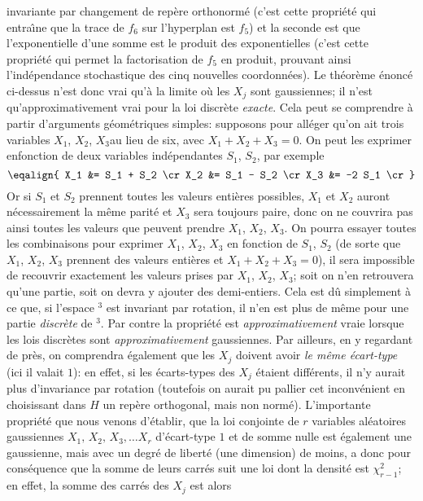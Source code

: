 invariante par changement de rep\`ere orthonorm\'e (c'est cette
propri\'et\'e qui entra{\^\i}ne que la trace de $f_6$ sur l'hyperplan est
$f_5$) et la seconde est que l'exponentielle d'une somme est le produit 
des exponentielles (c'est cette propri\'et\'e qui permet la factorisation 
de $f_5$ en produit, prouvant ainsi l'ind\'ependance stochastique des 
cinq nouvelles coordonn\'ees).  Le th\'eor\`eme \'enonc\'e ci-dessus 
n'est donc vrai qu'\`a la limite o\`u les $X_j$ sont gaussiennes; 
il n'est
qu'approximativement vrai pour la loi discr\`ete {\it exacte}. Cela peut se comprendre \`a partir d'arguments g\'eom\'etriques simples: 
supposons
pour all\'eger qu'on ait trois variables $X_1$, $X_2$, $X_3$au lieu de six,
 avec $X_1 + X_2 + X_3 = 0$.  On peut les exprimer enfonction de deux
variables ind\'ependantes $S_1$,  $S_2$, par exemple$$\eqalign{
X_1 &= S_1 + S_2 \cr
X_2 &= S_1 - S_2 \cr
X_3 &= -2 S_1 \cr }$$
Or si $S_1$ et $S_2$ prennent toutes les valeurs enti\`eres possibles, 
$X_1$ et $X_2$ auront n\'ecessairement la m\^eme parit\'e et $X_3$ sera
toujours paire, donc on ne couvrira pas ainsi toutes les valeurs que
peuvent prendre $X_1$, $X_2$, $X_3$. On pourra essayer toutes les
combinaisons pour exprimer $X_1$, $X_2$, $X_3$ en fonction de $S_1$, 
$S_2$ (de sorte que $X_1$, $X_2$, $X_3$ prennent des valeurs
enti\`eres et $X_1 + X_2 + X_3 = 0$), il sera impossible de recouvrir
exactement les valeurs prises par $X_1$, $X_2$, $X_3$; soit on n'en
retrouvera qu'une partie, soit on devra y ajouter des demi-entiers. Cela 
est d\^u simplement \`a ce que, si l'espace \R${}^3$ est invariant par
rotation, il n'en est plus de m\^eme pour une partie {\it discr\`ete} de
\R${}^3$. Par contre la propri\'et\'e est {\it approximativement} vraie 
lorsque les lois discr\`etes sont {\it approximativement} gaussiennes.
\medskip
Par ailleurs, en y regardant de pr\`es, on comprendra
\'egalement que les $X_j$ doivent avoir {\it le m\^eme \'ecart-type} (ici
il valait $1$): en effet, si les \'ecarts-types des $X_j$ \'etaient
diff\'erents, il n'y aurait plus d'invariance par rotation (toutefois on 
aurait pu pallier cet inconv\'enient en choisissant dans $H$ un rep\`ere
orthogonal, mais non norm\'e).
\medskip
L'importante propri\'et\'e que nous venons d'\'etablir, que la loi conjointe
de $r$ variables al\'eatoires gaussiennes $X_1,\, X_2,\, X_3, \ldots X_r$
d'\'ecart-type $1$ et de somme nulle est \'egalement une gaussienne, 
mais avec un degr\'e de libert\'e (une dimension) de moins, a donc pour 
cons\'equence que la somme de leurs carr\'es suit une loi dont la densit\'e 
est $\chi_{r-1}^2$; en effet, la somme des carr\'es des $X_j$ est alors
